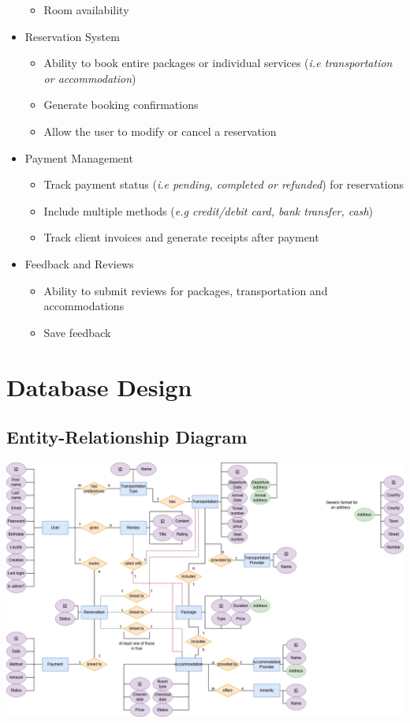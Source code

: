 \documentclass[11pt,a4paper,titlepage]{article}
\begin{document}
\begin{itemize}
\begin{itemize}
		\item Room availability
	\end{itemize}
	\item Reservation System
	\begin{itemize}
		\item Ability to book entire packages or individual services (\textit{i.e transportation or accommodation})
		\item Generate booking confirmations
		\item Allow the user to modify or cancel a reservation
	\end{itemize}
	\item Payment Management
	\begin{itemize}
		\item Track payment status (\textit{i.e pending, completed or refunded}) for reservations
		\item Include multiple methods (\textit{e.g credit/debit card, bank transfer, cash})
		\item Track client invoices and generate receipts after payment
	\end{itemize}
	\item Feedback and Reviews
	\begin{itemize}
		\item Ability to submit reviews for packages, transportation and accommodations
		\item Save feedback
	\end{itemize}
\end{itemize}

\section{Database Design}

\subsection{Entity-Relationship Diagram}
\includegraphics[width=450pt]{diag.png}
\newpage
\end{document}
